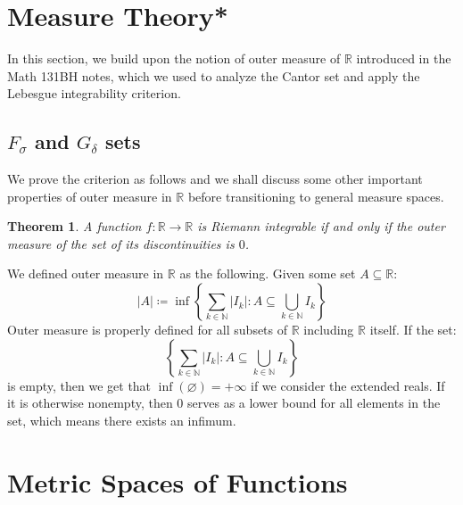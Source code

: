 \documentclass[10pt,letterpaper]{article} %
\newtheorem{thm}{Theorem}[section]
\begin{document}
\section{Measure Theory*}
In this section, we build upon the notion of outer measure of $\mathbb{R}$ introduced in the Math 131BH notes, which we used to analyze the Cantor set and apply the Lebesgue integrability criterion.

\subsection{$F_\sigma$ and $G_\delta$ sets}

We prove the criterion as follows and we shall discuss some other important properties of outer measure in $\mathbb{R}$ before transitioning to general measure spaces.
\begin{thm}
A function $f: \mathbb{R} \xrightarrow{} \mathbb{R}$ is Riemann integrable if and only if the outer measure of the set of its discontinuities is $0$.
\end{thm}
We defined outer measure in $\mathbb{R}$ as the following. Given some set $A \subseteq \mathbb{R}$:
\begin{equation*}
|A| \coloneq \inf\left\{\sum_{k \in \mathbb{N}} |I_k| : A \subseteq \bigcup_{k \in \mathbb{N}}I_k\right\}
\end{equation*}
Outer measure is properly defined for all subsets of $\mathbb{R}$ including $\mathbb{R}$ itself. If the set:
\begin{equation*}
\left\{\sum_{k \in \mathbb{N}}|I_k| : A \subseteq \bigcup_{k \in \mathbb{N}}I_k\right\}
\end{equation*}
is empty, then we get that $\inf(\varnothing) = + \infty$ if we consider the extended reals. If it is otherwise nonempty, then $0$ serves as a lower bound for all elements in the set, which means there exists an infimum.
\pagebreak
\section{Metric Spaces of Functions}
\end{document}
